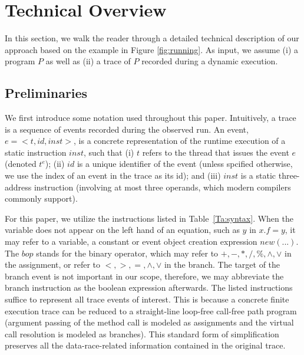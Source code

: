 \section{Technical Overview}\label{sec:overview}

In this section, we walk the reader through a detailed technical description of our approach based on the example in Figure \ref{fig:running}. 
%
As input, we assume (i) a program $P$ as well as (ii) a trace of $P$ recorded during a dynamic execution.



\subsection{Preliminaries}
We first introduce some notation used throughout this paper. Intuitively, a trace is a sequence of events recorded during the observed run. An event, $e=<t, id, inst>$, is a concrete representation of the runtime execution of a static instruction $inst$, such that (i) $t$ refers to the thread that issues the event $e$ (denoted $t^e$); (ii) $id$ is a unique identifier of the event (unless spcified otherwise, we use the index of an event in the trace as its id); and (iii) $inst$ is a static three-address instruction (involving at most three operands, which modern compilers commonly support).

For this paper, we utilize the instructions listed in Table~\ref{Ta:syntax}. When the variable does not appear on the left hand of an equation, such as $y$ in $x.f=y$, it may refer to a variable, a constant or event object creation expression $new (...)$.  The $bop$ stands for the binary operator, which may refer to $+, -, *, /, \%, \wedge, \vee$ in the assignment, or refer to $<, >, =, \wedge, \vee$ in the branch. The target of the branch event is not important in our scope, therefore, we may abbreviate the branch instruction as the boolean expression afterwards. The listed instructions suffice to represent all trace events of interest. This is because a concrete finite execution trace can be reduced to a straight-line loop-free call-free path program  (argument passing of the method call is modeled as assignments and the virtual call resolution is modeled as branches). This standard form of simplification preserves all the data-race-related information contained in the original trace. 

